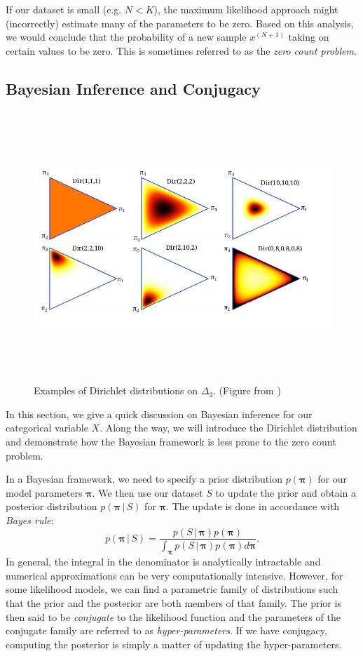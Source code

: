 \documentclass[final,3p,times,twocolumn]{elsarticle}
\let\bs\boldsymbol
\begin{document}
If our dataset is small (e.g. $N < K$), the maximum likelihood approach might (incorrectly) estimate many of the parameters to be zero.
Based on this analysis, we would conclude that the probability of a new sample $x^{(N+1)}$ taking on certain values to be zero.
This is sometimes referred to as the \emph{zero count problem}.

\subsection{Bayesian Inference and Conjugacy}
\label{sect:conjugacy}

\begin{figure}
\includegraphics[width=\textwidth,height=4in]{dir.png}
\caption{Examples of Dirichlet distributions on $\Delta_3$. (Figure from \cite{ywt07})}
\label{fig:dir}
\end{figure}

In this section, we give a quick discussion on Bayesian inference for our categorical variable $X$.
Along the way, we will introduce the Dirichlet distribution and demonstrate how the Bayesian framework is less prone to the zero count problem.

In a Bayesian framework, we need to specify a prior distribution $p(\bs \pi)$ for our model parameters $\bs \pi$.
We then use our dataset $S$ to update the prior and obtain a posterior distribution $p(\bs \pi\,|\,S)$ for $\bs \pi$.
The update is done in accordance with \emph{Bayes rule}:
\begin{equation}
\label{eqn:bayes}
p(\bs \pi \,|\, S) = \frac{p(S\,|\,\bs \pi) p(\bs \pi)}{\int_{\bs \pi} p(S\,|\,\bs \pi)p(\bs \pi)d\bs\pi}.
\end{equation}
In general, the integral in the denominator is analytically intractable and numerical approximations can be very computationally intensive.
However, for some likelihood models, we can find a parametric family of distributions such that the prior and the posterior are both members of that family. 
The prior is then said to be \emph{conjugate} to the likelihood function and the parameters of the conjugate family are referred to as \emph{hyper-parameters}.
If we have conjugacy, computing the posterior is simply a matter of updating the hyper-parameters.
\end{document}
